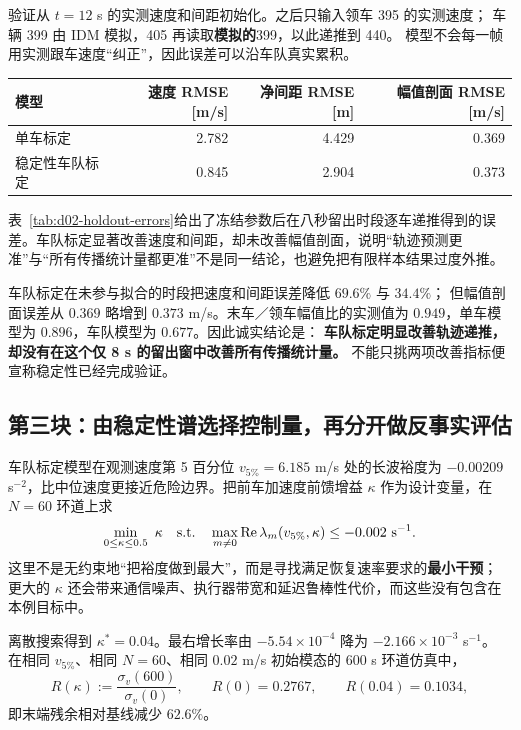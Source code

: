 \documentclass[11pt,a4paper,openany]{book}
\numberwithin{equation}{chapter}
\numberwithin{figure}{chapter}
\numberwithin{table}{chapter}
\newcommand{\tabletext}[2]{%
  \par\smallskip\noindent
  表~\ref{#1}给出了#2
  \par\smallskip
}
\begin{document}
验证从 $t=12$ s 的实测速度和间距初始化。之后只输入领车 395 的实测速度；
车辆 399 由 IDM 模拟，405 再读取\textbf{模拟的}399，以此递推到 440。
模型不会每一帧用实测跟车速度“纠正”，因此误差可以沿车队真实累积。

\begin{center}
\small
{}
\label{tab:d02-holdout-errors}
\begin{tabular}{p{3.7cm}rrr}
\toprule
\textbf{模型} & 速度 RMSE [m/s] & 净间距 RMSE [m] & 幅值剖面 RMSE [m/s]\\
\midrule
单车标定 & 2.782 & 4.429 & 0.369\\
稳定性车队标定 & 0.845 & 2.904 & 0.373\\
\bottomrule
\end{tabular}
\end{center}
\tabletext{tab:d02-holdout-errors}{冻结参数后在八秒留出时段逐车递推得到的误差。车队标定显著改善速度和间距，却未改善幅值剖面，说明“轨迹预测更准”与“所有传播统计量都更准”不是同一结论，也避免把有限样本结果过度外推。}
车队标定在未参与拟合的时段把速度和间距误差降低 $69.6\%$ 与 $34.4\%$；
但幅值剖面误差从 $0.369$ 略增到 $0.373$ m/s。末车／领车幅值比的实测值为
$0.949$，单车模型为 $0.896$，车队模型为 $0.677$。因此诚实结论是：
\textbf{车队标定明显改善轨迹递推，却没有在这个仅 8 s 的留出窗中改善所有传播统计量。}
不能只挑两项改善指标便宣称稳定性已经完成验证。

\subsection{第三块：由稳定性谱选择控制量，再分开做反事实评估}

车队标定模型在观测速度第 5 百分位
$v_{5\%}=6.185$ m/s 处的长波裕度为
$-0.00209$ s$^{-2}$，比中位速度更接近危险边界。把前车加速度前馈增益
$\kappa$ 作为设计变量，在 $N=60$ 环道上求
\begin{equation}
\min_{0\le\kappa\le0.5}\ \kappa
\quad\text{s.t.}\quad
\max_{m\ne0}\operatorname{Re}\lambda_m(v_{5\%},\kappa)
\le-0.002\ {\rm s}^{-1}.
\label{eq:ngsim-stability-optimization}
\end{equation}
这里不是无约束地“把裕度做到最大”，而是寻找满足恢复速率要求的\textbf{最小干预}；
更大的 $\kappa$ 还会带来通信噪声、执行器带宽和延迟鲁棒性代价，而这些没有包含在本例目标中。

离散搜索得到 $\kappa^*=0.04$。最右增长率由
$-5.54\times10^{-4}$ 降为 $-2.166\times10^{-3}$ s$^{-1}$。
在相同 $v_{5\%}$、相同 $N=60$、相同 $0.02$ m/s 初始模态的 600 s 环道仿真中，
\[
R(\kappa):=\frac{\sigma_v(600)}{\sigma_v(0)},\qquad
R(0)=0.2767,\qquad R(0.04)=0.1034,
\]
即末端残余相对基线减少 $62.6\%$。
\end{document}
